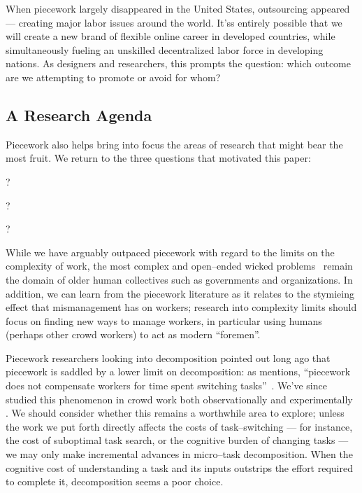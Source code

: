 \documentclass[trackingWork]{subfiles}
\begin{document}
When piecework largely disappeared in the United States, outsourcing appeared --- creating major labor issues around the world.
It'ss entirely possible that we will create a new brand of flexible online career in developed countries,
while simultaneously fueling an unskilled decentralized labor force in developing nations.
As designers and researchers, this prompts the question: which outcome are we attempting to promote or avoid for whom?


\subsection{A Research Agenda}\label{sec:whatShouldBeTheFuture}
Piecework also helps bring into focus the
areas of research that might bear the most fruit.
We return to the three questions that motivated this paper:
\begin{inlinelist}
  \item {}?
  \item {}?
  \item {}?
\end{inlinelist}

While we have arguably outpaced piecework with regard to the limits on the complexity of work,
the most complex and open--ended wicked problems~\cite{rittel1973dilemmas} remain the domain of older human collectives such as governments and organizations. 
In addition, we can learn from the piecework literature as it relates to
the stymieing effect that mismanagement has on workers;
research into complexity limits should focus on finding new ways to manage workers,
in particular using humans (perhaps other crowd workers)
to act as modern ``foremen''.

Piecework researchers looking into decomposition pointed out long ago that
piecework is saddled by a lower limit on decomposition:
as \citeauthor{bewley1999wages} mentions,
``piecework does not compensate workers for time spent switching tasks''~\cite{bewley1999wages}. 
We've since studied this phenomenon in crowd work both
observationally \cite{taskSearch} and
experimentally \cite{delayAndOrderLasecki}.
We should consider whether this remains a worthwhile area to explore;
unless the work we put forth directly affects the costs of task--switching
--- for instance, the cost of suboptimal task search, or the cognitive burden of changing tasks ---
we may only make incremental advances in micro--task decomposition.
When the cognitive cost of understanding a task and its inputs outstrips the effort required to complete it, decomposition seems a poor choice.
\end{document}
